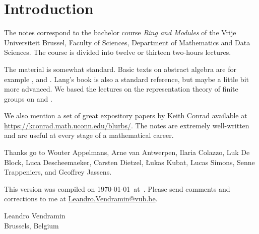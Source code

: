\section*{Introduction}

The notes correspond to the bachelor 
course \emph{Ring and Modules} of the 
Vrije Universiteit Brussel, 
Faculty of Sciences, 
Department of Mathematics and Data Sciences. The course
is divided into twelve or thirteen two-hours lectures. 

The material is somewhat standard. Basic texts on abstract algebra
are for example \cite{MR1129886}, \cite{MR2286236} and \cite{MR600654}. 
Lang's book \cite{MR783636} is also a standard reference, but 
maybe a little bit more advanced. 
We based the lectures on the representation theory of finite
groups on \cite{MR0450380} and 
\cite{MR2867444}. 

We also mention a set of great expository papers by 
Keith Conrad available at 
\url{https://kconrad.math.uconn.edu/blurbs/}. 
The notes are extremely well-written and are useful at  
every stage of a mathematical career. 


 Thanks go to Wouter Appelmans, Arne van Antwerpen, Ilaria Colazzo, Luk De Block, 
 Luca Descheemaeker, Carsten Dietzel, {\L}ukas Kubat, Lucas Simons, Senne Trappeniers, 
and Geoffrey Jassens. 

This version 
was compiled on \today~at~\currenttime. 
Please send comments and corrections to me at \url{Leandro.Vendramin@vub.be}. 


\bigskip
\begin{flushright}
Leandro Vendramin\\Brussels, Belgium\par
\end{flushright}

